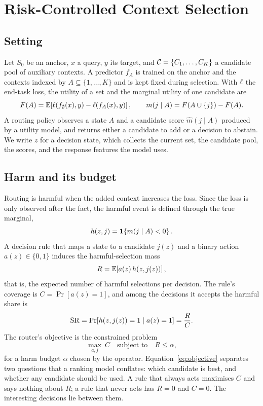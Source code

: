 \section{Risk-Controlled Context Selection}

\subsection{Setting}

Let $S_0$ be an anchor, $x$ a query, $y$ its target, and
$\mathcal{C}=\{C_1,\ldots,C_K\}$ a candidate pool of auxiliary contexts. A
predictor $f_A$ is trained on the anchor and the contexts indexed by
$A\subseteq\{1,\ldots,K\}$ and is kept fixed during selection. With $\ell$ the
end-task loss, the utility of a set and the marginal utility of one candidate
are
\begin{equation}
 F(A)=\mathbb{E}\!\left[\ell(f_{\emptyset}(x),y)-\ell(f_A(x),y)\right],
 \qquad
 m(j\mid A)=F(A\cup\{j\})-F(A).
 \label{eq:marginal}
\end{equation}
A routing policy observes a state $A$ and a candidate score
$\widehat m(j\mid A)$ produced by a utility model, and returns either a
candidate to add or a decision to abstain. We write $z$ for a decision state,
which collects the current set, the candidate pool, the scores, and the
response features the model uses.

\subsection{Harm and its budget}

Routing is harmful when the added context increases the loss. Since the loss
is only observed after the fact, the harmful event is defined through the true
marginal,
\begin{equation}
 h(z,j)=\mathbf{1}\!\left\{m(j\mid A)<0\right\}.
 \label{eq:harm}
\end{equation}
A decision rule that maps a state to a candidate $j(z)$ and a binary action
$a(z)\in\{0,1\}$ induces the harmful-selection mass
\begin{equation}
 R=\mathbb{E}\!\left[a(z)\,h\!\left(z,j(z)\right)\right],
 \label{eq:mass}
\end{equation}
that is, the expected number of harmful selections per decision. The rule's
coverage is $C=\Pr[a(z)=1]$, and among the decisions it accepts the harmful
share is
\begin{equation}
 \mathrm{SR}=\Pr\!\left[h(z,j(z))=1 \mid a(z)=1\right]=\frac{R}{C}.
 \label{eq:selective-risk}
\end{equation}
The router's objective is the constrained problem
\begin{equation}
 \max_{a,j}\ C
 \quad\text{subject to}\quad
 R\le\alpha ,
 \label{eq:objective}
\end{equation}
for a harm budget $\alpha$ chosen by the operator. Equation~\eqref{eq:objective}
separates two questions that a ranking model conflates: which candidate is
best, and whether any candidate should be used. A rule that always acts
maximises $C$ and says nothing about $R$; a rule that never acts has $R=0$ and
$C=0$. The interesting decisions lie between them.

